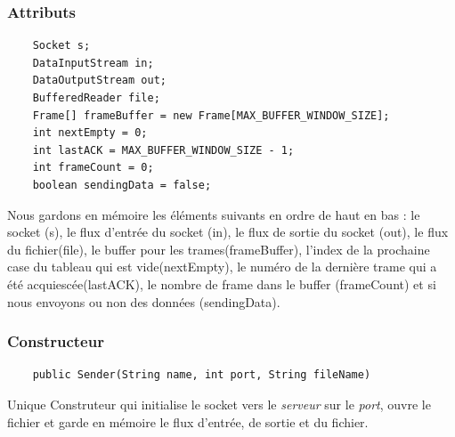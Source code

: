 \documentclass[a4paper,12pt]{article}
\begin{document}
\begin{spacing}{1}
	\subsubsection*{Attributs}
	\begin{lstlisting}
	Socket s;
	DataInputStream in;
	DataOutputStream out;
	BufferedReader file;
	Frame[] frameBuffer = new Frame[MAX_BUFFER_WINDOW_SIZE];
	int nextEmpty = 0;
	int lastACK = MAX_BUFFER_WINDOW_SIZE - 1;
	int frameCount = 0;
	boolean sendingData = false;
	\end{lstlisting}
	Nous gardons en mémoire les éléments suivants en ordre de haut en bas : le socket (s), le flux d'entrée du socket (in), le flux de sortie du socket (out), le flux du fichier(file), le buffer pour les trames(frameBuffer), l'index de la prochaine case du tableau qui est vide(nextEmpty), le numéro de la dernière trame qui a été acquiescée(lastACK), le nombre de frame dans le buffer (frameCount) et si nous envoyons ou non des données (sendingData).
	\subsubsection*{Constructeur}
	\begin{lstlisting}
	public Sender(String name, int port, String fileName)
	\end{lstlisting}
	Unique Construteur qui initialise le socket vers le \textit{serveur} sur le \textit{port}, ouvre le fichier et garde en mémoire le flux d'entrée, de sortie et du fichier.

\end{spacing}
\end{document}
